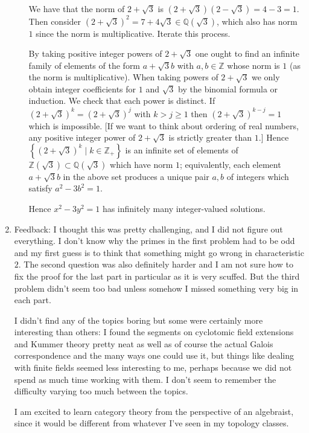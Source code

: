 \documentclass[11pt]{article}
\newcommand{\cbr}[1]{\left\{#1\right\}}
\begin{document}
\begin{enumerate}
\begin{enumerate}
        We have that the norm of $2+\sqrt{3}$ is $(2+\sqrt{3})(2-\sqrt{3}) = 4-3 = 1$. Then consider $(2+\sqrt{3})^2 = 7+4\sqrt{3}\in\mathbb{Q}(\sqrt{3})$, which also has norm $1$ since the norm is multiplicative. Iterate this process.
        
        By taking positive integer powers of $2+\sqrt{3}$ one ought to find an infinite family of elements of the form $a+\sqrt{3}b$ with $a,b\in\mathbb{Z}$ whose norm is $1$ (as the norm is multiplicative). When taking powers of $2+\sqrt{3}$ we only obtain integer coefficients for $1$ and $\sqrt{3}$ by the binomial formula or induction. We check that each power is distinct. If $(2+\sqrt{3})^k = (2+\sqrt{3})^j$ with $k>j\geq 1$ then $(2+\sqrt{3})^{k-j} = 1$ which is impossible. [If we want to think about ordering of real numbers, any positive integer power of $2+\sqrt{3}$ is strictly greater than $1$.] Hence $\cbr{(2+\sqrt{3})^k\mid k\in\mathbb{Z}_+}$ is an infinite set of elements of $\mathbb{Z}(\sqrt{3})\subset \mathbb{Q}(\sqrt{3})$ which have norm $1$; equivalently, each element $a+\sqrt{3}b$ in the above set produces a unique pair $a,b$ of integers which satisfy $a^2-3b^2=1$.

        Hence $x^2-3y^2=1$ has infinitely many integer-valued solutions.
    \end{enumerate}
    \item Feedback: I thought this was pretty challenging, and I did not figure out everything. I don't know why the primes in the first problem had to be odd and my first guess is to think that something might go wrong in characteristic $2$. The second question was also definitely harder and I am not sure how to fix the proof for the last part in particular as it is very scuffed. But the third problem didn't seem too bad unless somehow I missed something very big in each part.
    
    I didn't find any of the topics boring but some were certainly more interesting than others: I found the segments on cyclotomic field extensions and Kummer theory pretty neat as well as of course the actual Galois correspondence and the many ways one could use it, but things like dealing with finite fields seemed less interesting to me, perhaps because we did not spend as much time working with them. I don't seem to remember the difficulty varying too much between the topics. 

    I am excited to learn category theory from the perspective of an algebraist, since it would be different from whatever I've seen in my topology classes.
\end{enumerate}
\end{document}
